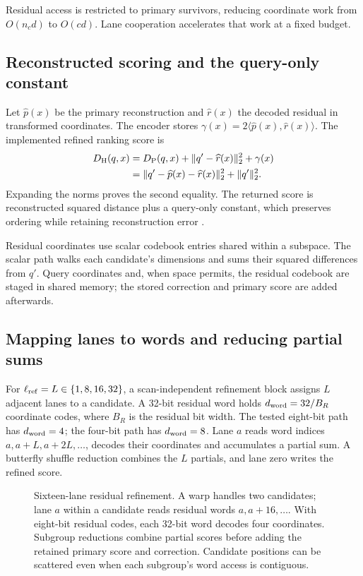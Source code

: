 Residual access is restricted to primary survivors, reducing coordinate
work from $O(n_cd)$ to $O(cd)$. Lane cooperation accelerates that work
at a fixed budget.

\subsection{Reconstructed scoring and the query-only constant}

Let $\widehat p(x)$ be the primary reconstruction and $\widehat r(x)$
the decoded residual in transformed coordinates. The encoder stores
$\gamma(x)=2\langle\widehat p(x),\widehat r(x)\rangle$.
The implemented refined ranking score is
\begin{align}
 D_{\mathrm{H}}(q,x)
 &=D_{\mathrm{P}}(q,x)+\|q'-\widehat r(x)\|_2^2+\gamma(x)
 \label{eq:5-refined-score}\\
 &=\|q'-\widehat p(x)-\widehat r(x)\|_2^2+\|q'\|_2^2.
 \label{eq:5-refined-constant}
\end{align}
Expanding the norms proves the second equality. The returned score is
reconstructed squared distance plus a query-only constant, which
preserves ordering while retaining reconstruction error \cite{jhq}.

Residual coordinates use scalar codebook entries shared within a
subspace. The scalar path walks each candidate's dimensions and sums
their squared differences from $q'$. Query coordinates and, when space
permits, the residual codebook are staged in shared memory; the stored
correction and primary score are added afterwards.

\subsection{Mapping lanes to words and reducing partial sums}

For $\ell_{\mathrm{ref}}=L\in\{1,8,16,32\}$, a scan-independent refinement block
assigns $L$ adjacent lanes to a candidate. A 32-bit residual word holds
$d_{\rm word}=32/B_R$ coordinate codes, where $B_R$ is the residual bit width.
The tested eight-bit path has $d_{\rm word}=4$; the four-bit path has $d_{\rm word}=8$.
Lane $a$ reads word indices $a,a+L,a+2L,\ldots$, decodes their
coordinates and accumulates a partial sum. A butterfly shuffle reduction
combines the $L$ partials, and lane zero writes the refined score.

\begin{figure}[tbp]
\centering

\caption[Sixteen-lane residual refinement]{Sixteen-lane residual refinement. A warp handles two candidates;
lane $a$ within a candidate reads residual words $a,a+16,\ldots$.
With eight-bit residual codes, each 32-bit word decodes four coordinates.
Subgroup reductions combine
partial scores before adding the retained primary score and correction.
Candidate positions can be scattered even when each subgroup's word
access is contiguous.}
\label{fig:5-lane-refinement}
\end{figure}

